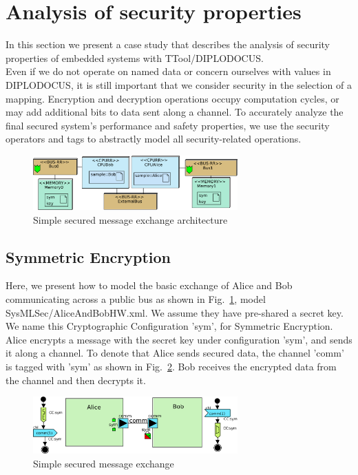 \documentclass{llncs}
\begin{document}
\pagebreak
\newpage
\section{Analysis of security properties}
\label{sec:Security}
%
In this section we present a case study that describes the analysis of security properties of embedded systems with
TTool/DIPLODOCUS.\\
%

Even if we do not operate on named data or concern ourselves with values in DIPLODOCUS, it is still important that we
consider security in the selection of a mapping. Encryption and decryption
operations occupy computation cycles, or may add additional bits to data sent along a channel. To accurately analyze the final secured system's performance and safety
properties, we use the security operators and tags to abstractly model all security-related operations.


\begin{figure}[htbp]
	\centering
 	\includegraphics[width=0.7\textwidth]{figures/securityStuff/sampleArch.pdf}
	\caption{Simple secured message exchange architecture}
	\label{fig:sampleArch}
\end{figure}

\subsection{Symmetric Encryption}
\label{sec:symenc}

Here, we present how to model the basic exchange of Alice and Bob communicating
across a public bus as shown in Fig.~\ref{fig:sampleArch}, model SysMLSec/AliceAndBobHW.xml. We assume they have
pre-shared a secret key. We name this Cryptographic Configuration 'sym', for
Symmetric Encryption. Alice encrypts a message with the secret key under
configuration 'sym', and sends it along a channel. To denote that Alice sends
secured data, the channel 'comm' is tagged with 'sym' as shown in
Fig.~\ref{fig:sampleComp}.
Bob receives the encrypted data from the channel and then decrypts it.

\begin{figure}[htbp]
	\centering
 	\includegraphics[width=0.7\textwidth]{figures/securityStuff/sampleComp.pdf}
	\caption{Simple secured message exchange}
	\label{fig:sampleComp}
\end{figure}
\end{document}

